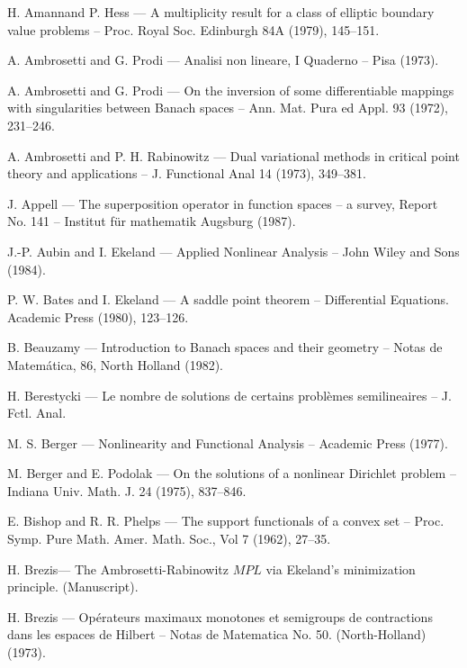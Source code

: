 \begin{thebibliography}{}
 H. Amann\pageoriginale and P. Hess --- A multiplicity
  result for a class of elliptic boundary value problems --
  Proc. Royal Soc. Edinburgh 84A (1979), 145--151.

 A. Ambrosetti and G. Prodi --- Analisi non lineare, I
  Quaderno -- Pisa (1973).

 A. Ambrosetti and G. Prodi --- On the inversion of some
  differentiable mappings with singularities between Banach spaces --
  Ann. Mat. Pura ed Appl. 93 (1972), 231--246.

 A. Ambrosetti and P. H. Rabinowitz --- Dual variational
  methods in critical point theory and applications -- J. Functional
  Anal 14 (1973), 349--381.

 J. Appell --- The superposition operator in function
  spaces -- a survey, Report No. 141 -- Institut f\"ur mathematik
  Augsburg (1987).

 J.-P. Aubin and I. Ekeland --- Applied Nonlinear
  Analysis -- John Wiley and Sons (1984).

 P. W. Bates and I. Ekeland --- A saddle point theorem --
  Differential Equations. Academic Press (1980), 123--126.

 B. Beauzamy --- Introduction to Banach spaces and their
  geometry -- Notas de Matem\'atica, 86, North Holland (1982).

 H. Berestycki --- Le nombre de solutions de certains
  probl\`emes semilineaires -- J. Fctl. Anal.

 M. S. Berger --- Nonlinearity and Functional Analysis
  -- Academic Press (1977).

 M. Berger and E. Podolak --- On the solutions of a
  nonlinear Dirichlet problem -- Indiana Univ. Math. J. 24 (1975), 837--846.

 E. Bishop and R. R. Phelps --- The support functionals
  of a convex set -- Proc. Symp. Pure Math. Amer. Math. Soc., Vol 7
  (1962), 27--35. 

 H. Brezis\pageoriginale --- The Ambrosetti-Rabinowitz
  $MPL$ via Ekeland's minimization principle. (Manuscript).

 H. Brezis --- Op\'erateurs maximaux monotones et
  semigroups de contractions dans les espaces de Hilbert -- Notas de
  Matematica No. 50. (North-Holland) (1973).


\end{thebibliography}
